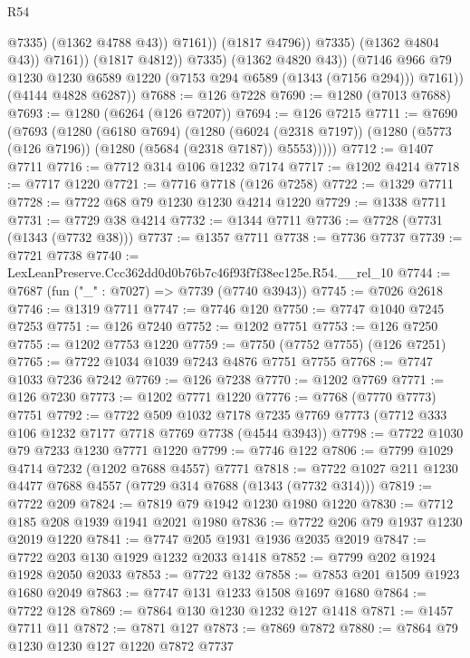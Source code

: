 \begin{lexlean}{R54}
\begin{coremodule}
                                @7335)
                              (@1362 @4788 @43))
                            @7161))
                        (@1817 @4796))
                      @7335)
                    (@1362 @4804 @43))
                  @7161))
              (@1817 @4812))
            @7335)
          (@1362 @4820 @43))
        (@7146 @966 @79 @1230 @1230 @6589 @1220 (@7153 @294 @6589 (@1343 (@7156 @294))) @7161))
      (@4144 @4828 @6287))
@7688 := @126 @7228
@7690 := @1280 (@7013 @7688)
@7693 := @1280 (@6264 (@126 @7207))
@7694 := @126 @7215
@7711 := @7690
    (@7693
      (@1280
        (@6180 @7694)
        (@1280
          (@6024 (@2318 @7197))
          (@1280 (@5773 (@126 @7196)) (@1280 (@5684 (@2318 @7187)) @5553)))))
@7712 := @1407 @7711
@7716 := @7712 @314 @106 @1232 @7174
@7717 := @1202 @4214
@7718 := @7717 @1220
@7721 := @7716 @7718 (@126 @7258)
@7722 := @1329 @7711
@7728 := @7722 @68 @79 @1230 @1230 @4214 @1220
@7729 := @1338 @7711
@7731 := @7729 @38 @4214
@7732 := @1344 @7711
@7736 := @7728 (@7731 (@1343 (@7732 @38)))
@7737 := @1357 @7711
@7738 := @7736 @7737
@7739 := @7721 @7738
@7740 := LexLeanPreserve.Ccc362dd0d0b76b7c46f93f7f38ec125e.R54.__rel_10
@7744 := @7687 (fun ("_" : @7027) => @7739 (@7740 @3943))
@7745 := @7026 @2618
@7746 := @1319 @7711
@7747 := @7746 @120
@7750 := @7747 @1040 @7245 @7253
@7751 := @126 @7240
@7752 := @1202 @7751
@7753 := @126 @7250
@7755 := @1202 @7753 @1220
@7759 := @7750 (@7752 @7755) (@126 @7251)
@7765 := @7722 @1034 @1039 @7243 @4876 @7751 @7755
@7768 := @7747 @1033 @7236 @7242
@7769 := @126 @7238
@7770 := @1202 @7769
@7771 := @126 @7230
@7773 := @1202 @7771 @1220
@7776 := @7768 (@7770 @7773) @7751
@7792 := @7722
    @509
    @1032
    @7178
    @7235
    @7769
    @7773
    (@7712 @333 @106 @1232 @7177 @7718 @7769 @7738 (@4544 @3943))
@7798 := @7722 @1030 @79 @7233 @1230 @7771 @1220
@7799 := @7746 @122
@7806 := @7799 @1029 @4714 @7232 (@1202 @7688 @4557) @7771
@7818 := @7722 @1027 @211 @1230 @4477 @7688 @4557 (@7729 @314 @7688 (@1343 (@7732 @314)))
@7819 := @7722 @209
@7824 := @7819 @79 @1942 @1230 @1980 @1220
@7830 := @7712 @185 @208 @1939 @1941 @2021 @1980
@7836 := @7722 @206 @79 @1937 @1230 @2019 @1220
@7841 := @7747 @205 @1931 @1936 @2035 @2019
@7847 := @7722 @203 @130 @1929 @1232 @2033 @1418
@7852 := @7799 @202 @1924 @1928 @2050 @2033
@7853 := @7722 @132
@7858 := @7853 @201 @1509 @1923 @1680 @2049
@7863 := @7747 @131 @1233 @1508 @1697 @1680
@7864 := @7722 @128
@7869 := @7864 @130 @1230 @1232 @127 @1418
@7871 := @1457 @7711 @11
@7872 := @7871 @127
@7873 := @7869 @7872
@7880 := @7864 @79 @1230 @1230 @127 @1220 @7872 @7737

\end{coremodule}
\end{lexlean}

